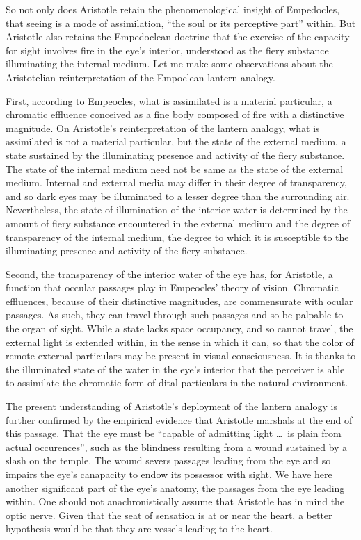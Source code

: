 So not only does Aristotle retain the phenomenological insight of Empedocles, that seeing is a mode of assimilation, ``the soul or its perceptive part'' within. But Aristotle also retains the Empedoclean doctrine that the exercise of the capacity for sight involves fire in the eye's interior, understood as the fiery substance illuminating the internal medium. Let me make some observations about the Aristotelian reinterpretation of the Empoclean lantern analogy. 

First, according to Empeocles, what is assimilated is a material particular, a chromatic effluence conceived as a fine body composed of fire with a distinctive magnitude. On Aristotle's reinterpretation of the lantern analogy, what is assimilated is not a material particular, but the state of the external medium, a state sustained by the illuminating presence and activity of the fiery substance. The state of the internal medium need not be same as the state of the external medium. Internal and external media may differ in their degree of transparency, and so dark eyes may be illuminated to a lesser degree than the surrounding air. Nevertheless, the state of illumination of the interior water is determined by the amount of fiery substance encountered in the external medium and the degree of transparency of the internal medium, the degree to which it is susceptible to the illuminating presence and activity of the fiery substance. 

Second, the transparency of the interior water of the eye has, for Aristotle, a function that occular passages play in Empeocles' theory of vision. Chromatic effluences, because of their distinctive magnitudes, are commensurate with ocular passages. As such, they can travel through such passages and so be palpable to the organ of sight. While a state lacks space occupancy, and so cannot travel, the external light is extended within, in the sense in which it can, so that the color of remote external particulars may be present in visual consciousness. It is thanks to the illuminated state of the water in the eye's interior that the perceiver is able to assimilate the chromatic form of dital particulars in the natural environment.

The present understanding of Aristotle's deployment of the lantern analogy is further confirmed by the empirical evidence that Aristotle marshals at the end of this passage. That the eye must be ``capable of admitting light \ldots\ is plain from actual occurences'', such as the blindness resulting from a wound sustained by a slash on the temple. The wound severs passages leading from the eye and so impairs the eye's canapacity to endow its possessor with sight. We have here another significant part of the eye's anatomy, the passages from the eye leading within. One should not anachronistically assume that Aristotle has in mind the optic nerve. Given that the seat of sensation is at or near the heart, a better hypothesis would be that they are vessels leading to the heart.


